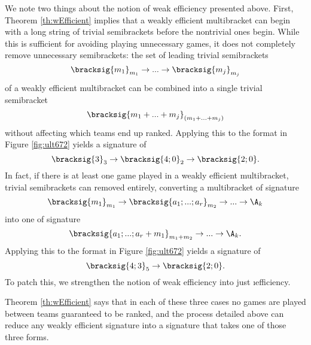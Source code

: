 {    
   

    We note two things about the notion of weak efficiency presented above. First, Theorem \ref{th:wEfficient} implies that a weakly efficient multibracket can begin with a long string of trivial semibrackets before the nontrivial ones begin. While this is sufficient for avoiding playing unnecessary games, it does not completely remove unnecessary semibrackets: the set of leading trivial semibrackets $$\bracksig{m_1}_{m_1} \to ... \to \bracksig{m_{j}}_{m_{j}}$$ of a weakly efficient multibracket can be combined into a single trivial semibracket $$\bracksig{m_1 + ... + m_{j}}_{(m_1 + ... + m_{j})}$$ without affecting which teams end up ranked. Applying this to the format in Figure \ref{fig:ult672} yields a signature of $$\bracksig{3}_3 \to \bracksig{4;0}_2 \to \bracksig{2;0}.$$ 
    In fact, if there is at least one game played in a weakly efficient multibracket, trivial semibrackets can removed entirely, converting a multibracket of signature $$\bracksig{m_1}_{m_1} \to \bracksig{a_1; ...; a_r}_{m_2} \to ... \to \A_k$$ into one of signature $$\bracksig{a_1; ...; a_r + m_1}_{m_1 + m_2} \to ... \to \A_k.$$ 
    Applying this to the format in Figure \ref{fig:ult672} yields a signature of $$\bracksig{4;3}_5 \to \bracksig{2;0}.$$
    To patch this, we strengthen the notion of weak efficiency into just \i{efficiency.}


    Theorem \ref{th:wEfficient} says that in each of these three cases no games are played between teams guaranteed to be ranked, and the process detailed above can reduce any weakly efficient signature into a signature that takes one of those three forms.

}
